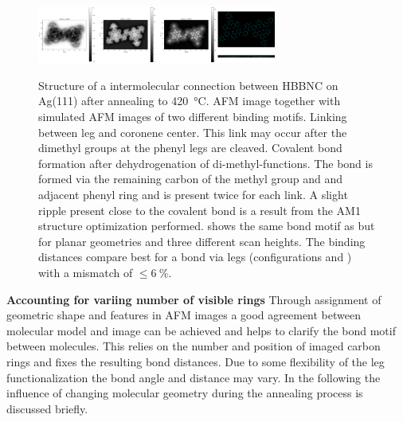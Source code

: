 \begin{figure}[]
{		\includegraphics[width=0.7\textwidth]{./images/00337-methyl-groups-fuse-link-2-split-hydrogen-detail}
		\label{fig:HBBNC-link-lost-hydrogen-guess}
	}
	\caption{Structure of a intermolecular connection between HBBNC on Ag(111) after annealing to \SI{420}{\celsius}. AFM image  together with simulated AFM images of two different binding motifs.  Linking between leg and coronene center. This link may occur after the dimethyl groups at the phenyl legs are cleaved.  Covalent bond formation after dehydrogenation of di-methyl-functions. The bond is formed via the remaining carbon of the methyl group and and adjacent phenyl ring and is present twice for each link. A slight ripple present close to the covalent bond is a result from the AM1 structure optimization performed.  shows the same bond motif as  but for planar geometries and three different scan heights. The binding distances compare best for a bond via legs (configurations  and ) with a mismatch of $\leq \SI{6}{\percent}$.}
	\label{fig:HBBNC-linking}
\end{figure}


\textbf{Accounting for variing number of visible rings}
Through assignment of geometric shape and features in AFM images a good agreement between molecular model and image can be achieved and helps to clarify the bond motif between molecules. This relies on the number and position of imaged carbon rings and fixes the resulting bond distances. 
 Due to some flexibility of the leg functionalization the bond angle and distance may vary. In the following the influence of changing molecular geometry during the annealing process is discussed briefly.
 
